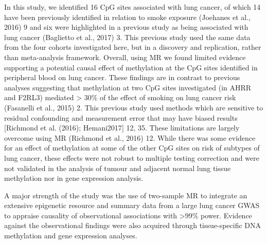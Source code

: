 \documentclass[11pt,twoside]{bristolthesis}
\begin{document}
In this study, we identified 16 CpG sites associated with lung cancer, of which 14 have been previously identified in relation to smoke exposure (Joehanes et al., 2016) 9 and six were highlighted in a previous study as being associated with lung cancer (Baglietto et al., 2017) 3. This previous study used the same data from the four cohorts investigated here, but in a discovery and replication, rather than meta-analysis framework. Overall, using MR we found limited evidence supporting a potential causal effect of methylation at the CpG sites identified in peripheral blood on lung cancer. These findings are in contrast to previous analyses suggesting that methylation at two CpG sites investigated (in AHRR and F2RL3) mediated \textgreater{} 30\% of the effect of smoking on lung cancer risk (Fasanelli et al., 2015) 2. This previous study used methods which are sensitive to residual confounding and measurement error that may have biased results {[}Richmond et al. (2016); Hemani2017{]} 12, 35. These limitations are largely overcome using MR (Richmond et al., 2016) 12. While there was some evidence for an effect of methylation at some of the other CpG sites on risk of subtypes of lung cancer, these effects were not robust to multiple testing correction and were not validated in the analysis of tumour and adjacent normal lung tissue methylation nor in gene expression analysis.

A major strength of the study was the use of two-sample MR to integrate an extensive epigenetic resource and summary data from a large lung cancer GWAS to appraise causality of observational associations with \textgreater99\% power. Evidence against the observational findings were also acquired through tissue-specific DNA methylation and gene expression analyses.
\end{document}
